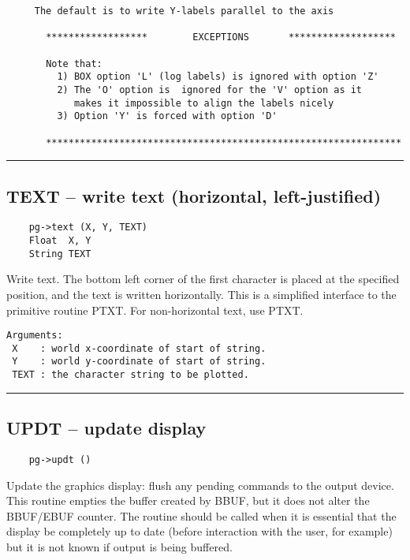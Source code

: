 \begin{verbatim}
     The default is to write Y-labels parallel to the axis

       ******************        EXCEPTIONS       *******************

       Note that:
         1) BOX option 'L' (log labels) is ignored with option 'Z' 
         2) The 'O' option is  ignored for the 'V' option as it 
            makes it impossible to align the labels nicely
         3) Option 'Y' is forced with option 'D'

       ***************************************************************

\end{verbatim}

\hrule

\subsection*{TEXT -- write text (horizontal, left-justified) }

\begin{verbatim}
    pg->text (X, Y, TEXT)
    Float  X, Y
    String TEXT
\end{verbatim}

Write text.  The bottom left corner of the first character is placed
at the specified position, and the text is written horizontally.  This
is a simplified interface to the primitive routine PTXT.  For
non-horizontal text, use PTXT.

\begin{verbatim}
Arguments:
 X    : world x-coordinate of start of string.
 Y    : world y-coordinate of start of string.
 TEXT : the character string to be plotted.
\end{verbatim}

\hrule

\subsection*{UPDT -- update display }

\begin{verbatim}
    pg->updt ()
\end{verbatim}

Update the graphics display: flush any pending commands to the output
device.  This routine empties the buffer created by BBUF, but it does
not alter the BBUF/EBUF counter.  The routine should be called when it
is essential that the display be completely up to date (before
interaction with the user, for example) but it is not known if output
is being buffered.

